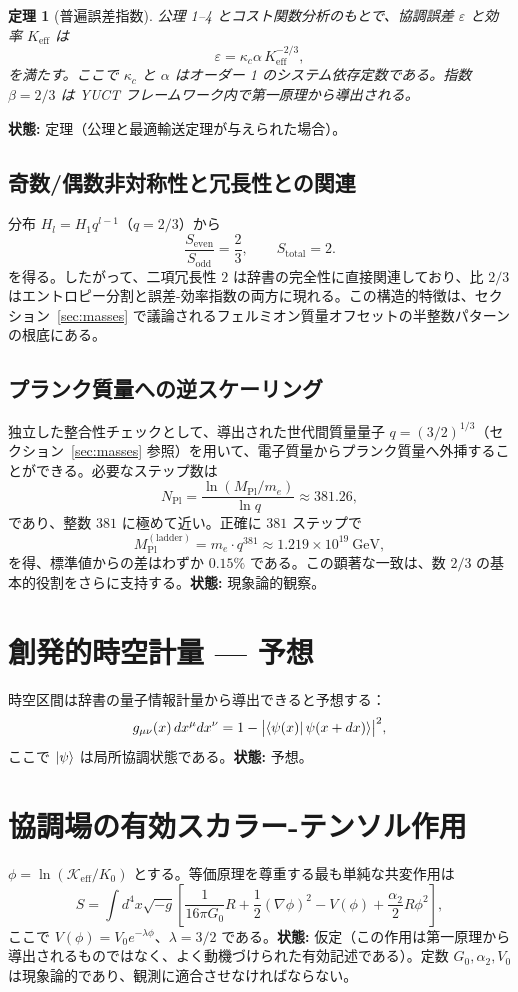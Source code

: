 \documentclass[11pt,a4paper]{article}
\newtheorem{theorem}{定理}[section]
\newcommand{\Mpl}{M_{\mathrm{Pl}}}
\begin{document}
	\begin{theorem}[普遍誤差指数]
		公理 1–4 とコスト関数分析のもとで、協調誤差 \(\varepsilon\) と効率 \(K_{\mathrm{eff}}\) は
		\[
		\boxed{\varepsilon = \kappa_c \alpha \, K_{\mathrm{eff}}^{-2/3}},
		\]
		を満たす。ここで \(\kappa_c\) と \(\alpha\) はオーダー 1 のシステム依存定数である。指数 \(\beta = 2/3\) は YUCT フレームワーク内で第一原理から導出される。
	\end{theorem}
	\textbf{状態:} 定理（公理と最適輸送定理が与えられた場合）。
	
	\subsection{奇数/偶数非対称性と冗長性との関連}
	分布 \(H_l = H_1 q^{l-1}\)（\(q=2/3\)）から
	\[
	\frac{S_{\mathrm{even}}}{S_{\mathrm{odd}}} = \frac{2}{3}, \qquad S_{\mathrm{total}} = 2.
	\]
	を得る。したがって、二項冗長性 \(2\) は辞書の完全性に直接関連しており、比 \(2/3\) はエントロピー分割と誤差-効率指数の両方に現れる。この構造的特徴は、セクション~\ref{sec:masses} で議論されるフェルミオン質量オフセットの半整数パターンの根底にある。
	
	\subsection{プランク質量への逆スケーリング}
	独立した整合性チェックとして、導出された世代間質量量子 \(q = (3/2)^{1/3}\)（セクション~\ref{sec:masses} 参照）を用いて、電子質量からプランク質量へ外挿することができる。必要なステップ数は
	\[
	N_{\mathrm{Pl}} = \frac{\ln(\Mpl/m_e)}{\ln q} \approx 381.26,
	\]
	であり、整数 \(381\) に極めて近い。正確に \(381\) ステップで
	\[
	\Mpl^{\mathrm{(ladder)}} = m_e \cdot q^{381} \approx 1.219\times10^{19}\ \mathrm{GeV},
	\]
	を得、標準値からの差はわずか \(0.15\%\) である。この顕著な一致は、数 \(2/3\) の基本的役割をさらに支持する。\textbf{状態:} 現象論的観察。
	
	\section{創発的時空計量 — 予想}
	\label{sec:metric}
	時空区間は辞書の量子情報計量から導出できると予想する：
	\[
	g_{\mu\nu}(x) \, dx^\mu dx^\nu = 1 - \bigl| \bra{\psi(x)} \psi(x+dx) \rangle \bigr|^2,
	\]
	ここで \(\ket{\psi}\) は局所協調状態である。\textbf{状態:} 予想。
	
	\section{協調場の有効スカラー-テンソル作用}
	\label{sec:action}
	\(\phi = \ln(\mathcal{K}_{\mathrm{eff}}/K_0)\) とする。等価原理を尊重する最も単純な共変作用は
	\begin{equation}
		S = \int d^4x\sqrt{-g}\left[ \frac{1}{16\pi G_0} R + \frac12(\nabla\phi)^2 - V(\phi) + \frac{\alpha_2}{2}R\phi^2 \right],
		\label{eq:action}
	\end{equation}
	ここで \(V(\phi) = V_0 e^{-\lambda\phi}\)、\(\lambda = 3/2\) である。\textbf{状態:} 仮定（この作用は第一原理から導出されるものではなく、よく動機づけられた有効記述である）。定数 \(G_0, \alpha_2, V_0\) は現象論的であり、観測に適合させなければならない。
	
\end{document}
